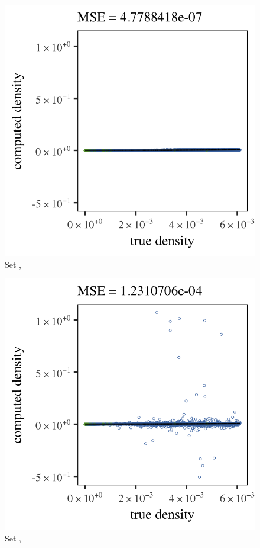 \begin{subfigure}{0.23\textwidth}
	\centering
	\includegraphics[keepaspectratio=true, width=\textwidth, height=0.23\textheight]{4/img/all/results_baakman_1_60000_mbe_silverman}
	\caption{Set \baakmanOne, \mbe}
	\label{fig:4:results:mbe:baakman1}
\end{subfigure}
\begin{subfigure}{0.23\textwidth}
	\centering
	\includegraphics[keepaspectratio=true, width=\textwidth, height=0.23\textheight]{4/img/all/results_baakman_1_60000_sambe_silverman}
	\caption{Set \baakmanOne, \sambe}
	\label{fig:4:results:sambe:baakman1}
\end{subfigure}
